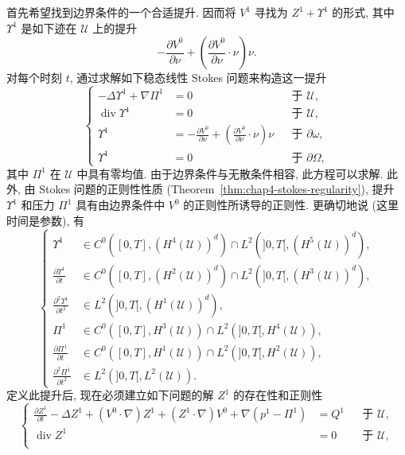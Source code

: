 \begin{sloppypar}
\begin{Proof}
首先希望找到边界条件的一个合适提升. 因而将 $V^1$ 寻找为 $Z^1+\Upsilon^1$ 的形式, 其中 $\Upsilon^1$ 是如下迹在 $\mathcal U$ 上的提升
\[
 -\frac{\partial V^0}{\partial\nu}
 +\left(\frac{\partial V^0}{\partial\nu}\cdot\nu\right)\nu.
\]
对每个时刻 $t$, 通过求解如下稳态线性 Stokes 问题来构造这一提升
\[
\left\{
\begin{aligned}
 -\Delta\Upsilon^1+\nabla\Pi^1&=0&&\text{于 }\mathcal U,\\
 \operatorname{div}\Upsilon^1&=0&&\text{于 }\mathcal U,\\
 \Upsilon^1&=-\frac{\partial V^0}{\partial\nu}
 +\left(\frac{\partial V^0}{\partial\nu}\cdot\nu\right)\nu
 &&\text{于 }\partial\omega,\\
 \Upsilon^1&=0&&\text{于 }\partial\Omega,
\end{aligned}
\right.
\]
其中 $\Pi^1$ 在 $\mathcal U$ 中具有零均值. 由于边界条件与无散条件相容, 此方程可以求解. 此外, 由 Stokes 问题的正则性性质 (Theorem~\ref{thm:chap4-stokes-regularity}), 提升 $\Upsilon^1$ 和压力 $\Pi^1$ 具有由边界条件中 $V^0$ 的正则性所诱导的正则性. 更确切地说 (这里时间是参数), 有
\begin{equation}
\left\{
\begin{aligned}
 \Upsilon^1&\in C^0([0,T],(H^4(\mathcal U))^d)\cap L^2(]0,T[,(H^5(\mathcal U))^d),\\
 \frac{\partial\Upsilon^1}{\partial t}&\in C^0([0,T],(H^2(\mathcal U))^d)\cap L^2(]0,T[,(H^3(\mathcal U))^d),\\
 \frac{\partial^2\Upsilon^1}{\partial t^2}&\in L^2(]0,T[,(H^1(\mathcal U))^d),\\
 \Pi^1&\in C^0([0,T],H^3(\mathcal U))\cap L^2(]0,T[,H^4(\mathcal U)),\\
 \frac{\partial\Pi^1}{\partial t}&\in C^0([0,T],H^1(\mathcal U))\cap L^2(]0,T[,H^2(\mathcal U)),\\
 \frac{\partial^2\Pi^1}{\partial t^2}&\in L^2(]0,T[,L^2(\mathcal U)).
\end{aligned}
\right.
\label{eq:chap7-Upsilon1-regularity}
\end{equation}
定义此提升后, 现在必须建立如下问题的解 $Z^1$ 的存在性和正则性
\begin{equation}
\left\{
\begin{aligned}
 \frac{\partial Z^1}{\partial t}-\Delta Z^1+(V^0\cdot\nabla)Z^1
 +(Z^1\cdot\nabla)V^0+\nabla(p^1-\Pi^1)&=Q^1&&\text{于 }\mathcal U,\\
 \operatorname{div}Z^1&=0&&\text{于 }\mathcal U,\\

\end{aligned}
\end{equation}
\end{Proof}
\end{sloppypar}
